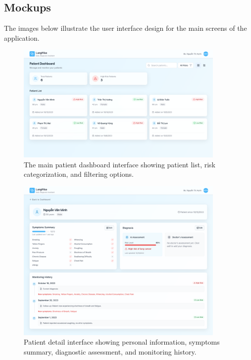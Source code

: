 \subsection{Mockups}
The images below illustrate the user interface design for the main screens of the application.

\begin{figure}[h]
    \centering
    \includegraphics[width=0.9\textwidth]{Images/dashboard.png}
    \caption{The main patient dashboard interface showing patient list, risk categorization, and filtering options.}
    \label{fig:dashboard_mockup}
\end{figure}

\begin{figure}[h]
    \centering
    \includegraphics[width=0.9\textwidth]{Images/patient_detail.png}
    \caption{Patient detail interface showing personal information, symptoms summary, diagnostic assessment, and monitoring history.}
    \label{fig:patient_detail_mockup}
\end{figure}

